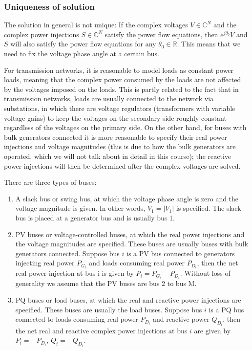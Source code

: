 \subsubsection*{Uniqueness of solution}
The solution in general is not unique: If the complex voltages $V\in\mathbb{C}^N$ and the complex power injections $S\in\mathbb{C}^N$ satisfy the power flow equations, then $e^{j\theta_0} V$ and $S$ will also satisfy the power flow equations for any $\theta_0\in\mathbb{R}$. This means that we need to fix the voltage phase angle at a certain bus.


\begin{remark}For transmission networks, it is reasonable to model loads as constant power loads, meaning that the complex power consumed by the loads are not affected by the voltages imposed on the loads. This is partly related to the fact that in transmission networks, loads are usually connected to the network via substations, in which there are voltage regulators (transformers with variable voltage gains) to keep the voltages on the secondary side roughly constant regardless of the voltages on the primary side.
On the other hand, for buses with bulk generators connected it is more reasonable to specify their real power injections and voltage magnitudes (this is due
to how the bulk generators are operated, which we will not talk about in detail in this course); the reactive power injections will then be determined after the complex voltages are solved.
\end{remark}

There are three types of buses:
\begin{enumerate}
\item  A slack bus or swing bus, at which the voltage phase angle is zero and the
voltage magnitude is given. In other words, $V_1 = |V_1|$ is specified. The slack bus is placed at a generator bus and is usually bus 1.
\item PV buses or voltage-controlled buses, at which the real power injections and the voltage magnitudes are specified. These buses are usually buses with bulk generators connected.
Suppose bus $i$ is a PV bus connected to generators injecting real power $P_{G_i}$ and loads consuming real power $P_{D_i}$, then the net real power injection at bus i is given by $P_i = P_{G_i} - P_{D_i}$.
Without loss of generality we assume that the PV buses are bus 2 to bus M.
\item PQ buses or load buses, at which the real and reactive power injections are specified. These buses are usually the load buses.
Suppose bus $i$ is a PQ bus connected to loads consuming real power $P_{D_i}$ and reactive power $Q_{D_i}$, then the net real and reactive complex power injections at bus $i$ are given by $P_i = -P_{D_i}$, $Q_i = -Q_{D_i}$.
\end{enumerate}


